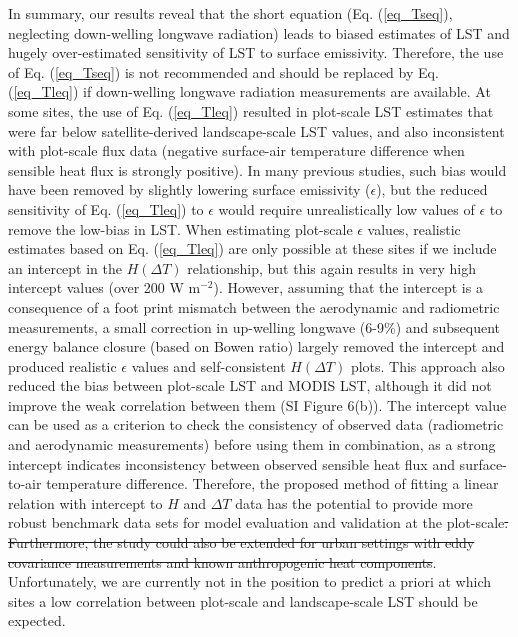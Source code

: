 \documentclass[fleqn,10pt]{wlscirep}
\providecommand{\DIFaddtex}[1]{{\protect\color{blue}\uwave{#1}}} %
\providecommand{\DIFdeltex}[1]{{\protect\color{red}\sout{#1}}}                      %
\providecommand{\DIFaddbegin}{} %
\providecommand{\DIFaddend}{} %
\providecommand{\DIFdelbegin}{} %
\providecommand{\DIFdelend}{} %
\providecommand{\DIFadd}[1]{\texorpdfstring{\DIFaddtex{#1}}{#1}} %
\providecommand{\DIFdel}[1]{\texorpdfstring{\DIFdeltex{#1}}{}} %
\begin{document}
In summary, our results reveal that the short equation (Eq. (\ref{eq_Tseq}), neglecting down-welling longwave radiation) leads to biased estimates of LST and hugely over-estimated sensitivity of LST to surface emissivity. Therefore, the use of Eq. (\ref{eq_Tseq}) is not recommended and should be replaced by Eq. (\ref{eq_Tleq}) if down-welling longwave radiation measurements are available. At some sites, the use of Eq. (\ref{eq_Tleq}) resulted in plot-scale LST estimates that were far below satellite-derived landscape-scale LST values, and also inconsistent with plot-scale flux data (negative surface-air temperature difference when sensible heat flux is strongly positive). In many previous studies, such bias would have been removed by slightly lowering surface emissivity ($\epsilon$), but the reduced sensitivity of Eq. (\ref{eq_Tleq}) to $\epsilon$ would require unrealistically low values of $\epsilon$ to remove the low-bias in LST. When estimating plot-scale $\epsilon$ values, realistic estimates based on Eq. (\ref{eq_Tleq}) are only possible at these sites if we include an intercept in the $H (\Delta T)$ relationship, but this again results in very high intercept values (over 200 W m$^{-2}$). However, assuming that the intercept is a consequence of a foot print mismatch between the aerodynamic and radiometric measurements, a small correction in up-welling longwave (6-9\%) and subsequent energy balance closure (based on Bowen ratio) largely removed the intercept and produced realistic $\epsilon$ values and self-consistent $H(\Delta T)$ plots. This approach also reduced the bias between plot-scale LST and MODIS LST, although it did not improve the weak correlation between them (SI Figure 6(b)). The intercept value can be used as a criterion to check the consistency of observed data (radiometric and aerodynamic measurements) before using them in combination, as a strong intercept indicates inconsistency between observed sensible heat flux and surface-to-air temperature difference. Therefore, the proposed method of fitting a linear relation with intercept to $H$ and $\Delta T$ data has the potential to provide more robust benchmark data sets for model evaluation and validation at the \DIFaddbegin \DIFadd{ecosystem scale (}\DIFaddend plot-scale\DIFdelbegin \DIFdel{. Furthermore, the study could also be extended for urban settings with eddy covariance measurements and known anthropogenic heat components}\DIFdelend \DIFaddbegin \DIFadd{)}\DIFaddend . Unfortunately, we are currently not in the position to predict a priori at which sites a low correlation between plot-scale and landscape-scale LST should be expected.
\DIFaddbegin 
\end{document}
